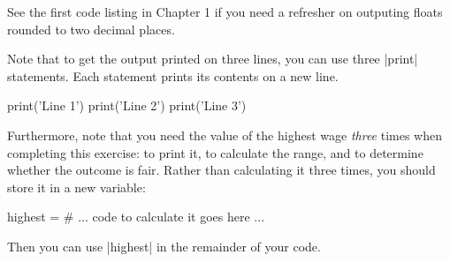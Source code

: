 See the first code listing in Chapter 1 if you need a refresher on outputing floats
rounded to two decimal places.

Note that to get the output printed on three lines, you can use three \pycode|print|
statements. Each statement prints its contents on a new line.
\begin{pythoncode}
  print('Line 1')
  print('Line 2')
  print('Line 3')
\end{pythoncode}

Furthermore, note that you need the value of the highest wage \emph{three} times when
completing this exercise: to print it, to calculate the range, and to determine whether
the outcome is fair. Rather than calculating it three times, you should store it in a new
variable:
\begin{pythoncode}
  highest = # ... code to calculate it goes here ...
\end{pythoncode}

Then you can use \pycode|highest| in the remainder of your code.

